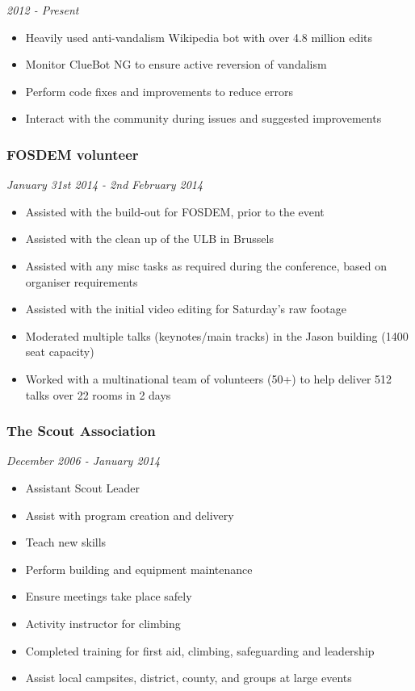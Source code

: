 \emph{2012 - Present}

\begin{itemize}
\tightlist
\item
  Heavily used anti-vandalism Wikipedia bot with over 4.8 million edits
\item
  Monitor ClueBot NG to ensure active reversion of vandalism
\item
  Perform code fixes and improvements to reduce errors
\item
  Interact with the community during issues and suggested improvements
\end{itemize}

\subsubsection{FOSDEM volunteer}\label{fosdem-volunteer}

\emph{January 31st 2014 - 2nd February 2014}

\begin{itemize}
\tightlist
\item
  Assisted with the build-out for FOSDEM, prior to the event
\item
  Assisted with the clean up of the ULB in Brussels
\item
  Assisted with any misc tasks as required during the conference, based
  on organiser requirements
\item
  Assisted with the initial video editing for Saturday's raw footage
\item
  Moderated multiple talks (keynotes/main tracks) in the Jason building
  (1400 seat capacity)
\item
  Worked with a multinational team of volunteers (50+) to help deliver
  512 talks over 22 rooms in 2 days
\end{itemize}

\subsubsection{The Scout Association}\label{the-scout-association}

\emph{December 2006 - January 2014}

\begin{itemize}
\tightlist
\item
  Assistant Scout Leader
\item
  Assist with program creation and delivery
\item
  Teach new skills
\item
  Perform building and equipment maintenance
\item
  Ensure meetings take place safely
\item
  Activity instructor for climbing
\item
  Completed training for first aid, climbing, safeguarding and
  leadership
\item
  Assist local campsites, district, county, and groups at large events
\end{itemize}

